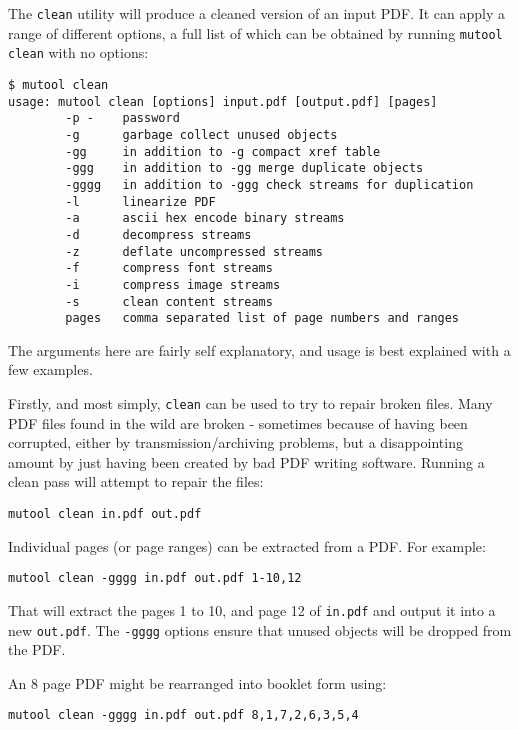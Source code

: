 \documentclass[oneside]{book}
\begin{document}
The \texttt{clean} utility will produce a cleaned version of an input PDF. It can apply a range of different options, a full list of which can be obtained by running \texttt{mutool clean} with no options:

\begin{lstlisting}
$ mutool clean
usage: mutool clean [options] input.pdf [output.pdf] [pages]
        -p -    password
        -g      garbage collect unused objects
        -gg     in addition to -g compact xref table
        -ggg    in addition to -gg merge duplicate objects
        -gggg   in addition to -ggg check streams for duplication
        -l      linearize PDF
        -a      ascii hex encode binary streams
        -d      decompress streams
        -z      deflate uncompressed streams
        -f      compress font streams
        -i      compress image streams
        -s      clean content streams
        pages   comma separated list of page numbers and ranges
\end{lstlisting}

The arguments here are fairly self explanatory, and usage is best explained with a few examples.

Firstly, and most simply, \texttt{clean} can be used to try to repair broken files. Many PDF files found in the wild are broken - sometimes because of having been corrupted, either by transmission/archiving problems, but a disappointing amount by just having been created by bad PDF writing software. Running a clean pass will attempt to repair the files:

\begin{lstlisting}
mutool clean in.pdf out.pdf
\end{lstlisting}

Individual pages (or page ranges) can be extracted from a PDF. For example:

\begin{lstlisting}
mutool clean -gggg in.pdf out.pdf 1-10,12
\end{lstlisting}

That will extract the pages 1 to 10, and page 12 of \texttt{in.pdf} and output it into a new \texttt{out.pdf}. The \texttt{-gggg} options ensure that unused objects will be dropped from the PDF.

An 8 page PDF might be rearranged into booklet form using:

\begin{lstlisting}
mutool clean -gggg in.pdf out.pdf 8,1,7,2,6,3,5,4
\end{lstlisting}
\end{document}
